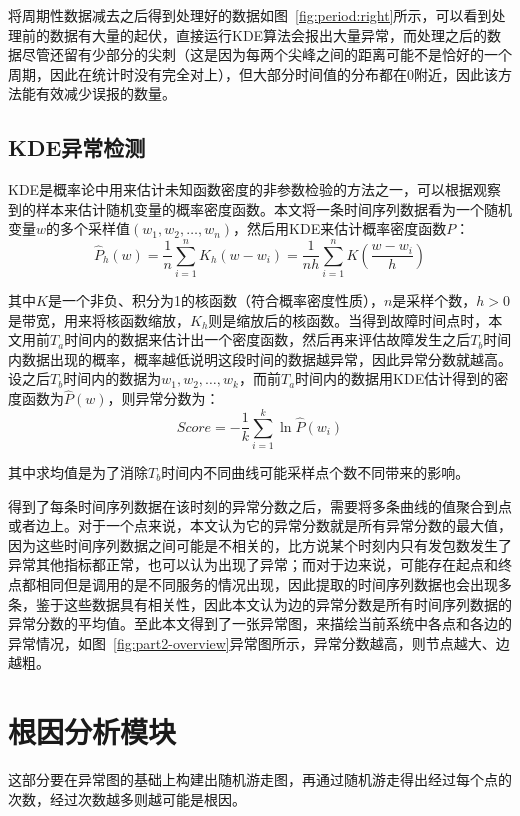 将周期性数据减去之后得到处理好的数据如图~\ref{fig:period:right}所示，可以看到处理前的数据有大量的起伏，直接运行KDE算法会报出大量异常，而处理之后的数据尽管还留有少部分的尖刺（这是因为每两个尖峰之间的距离可能不是恰好的一个周期，因此在统计时没有完全对上），但大部分时间值的分布都在0附近，因此该方法能有效减少误报的数量。

\subsection{KDE异常检测}
KDE是概率论中用来估计未知函数密度的非参数检验的方法之一，可以根据观察到的样本来估计随机变量的概率密度函数。本文将一条时间序列数据看为一个随机变量$w$的多个采样值$(w_1,w_2,\dots,w_n)$，然后用KDE来估计概率密度函数$P$：
\begin{equation*}
\hat{P}_h(w) = \frac{1}{n}\sum_{i=1}^nK_h(w-w_i) = \frac{1}{nh}\sum_{i=1}^nK(\frac{w-w_i}{h})
\end{equation*}

其中$K$是一个非负、积分为1的核函数（符合概率密度性质），$n$是采样个数，$h>0$是带宽，用来将核函数缩放，$K_h$则是缩放后的核函数。当得到故障时间点时，本文用前$T_a$时间内的数据来估计出一个密度函数，然后再来评估故障发生之后$T_b$时间内数据出现的概率，概率越低说明这段时间的数据越异常，因此异常分数就越高。设之后$T_b$时间内的数据为$w_1,w_2,\dots,w_k$，而前$T_a$时间内的数据用KDE估计得到的密度函数为$\hat{P}(w)$，则异常分数为：
\begin{equation*}
  Score = -\frac{1}{k}\sum_{i=1}^k\ln \hat{P}(w_i)
\end{equation*}

其中求均值是为了消除$T_b$时间内不同曲线可能采样点个数不同带来的影响。

得到了每条时间序列数据在该时刻的异常分数之后，需要将多条曲线的值聚合到点或者边上。对于一个点来说，本文认为它的异常分数就是所有异常分数的最大值，因为这些时间序列数据之间可能是不相关的，比方说某个时刻内只有发包数发生了异常其他指标都正常，也可以认为出现了异常；而对于边来说，可能存在起点和终点都相同但是调用的是不同服务的情况出现，因此提取的时间序列数据也会出现多条，鉴于这些数据具有相关性，因此本文认为边的异常分数是所有时间序列数据的异常分数的平均值。至此本文得到了一张异常图，来描绘当前系统中各点和各边的异常情况，如图~\ref{fig:part2-overview}异常图所示，异常分数越高，则节点越大、边越粗。
\section{根因分析模块}
这部分要在异常图的基础上构建出随机游走图，再通过随机游走得出经过每个点的次数，经过次数越多则越可能是根因。


